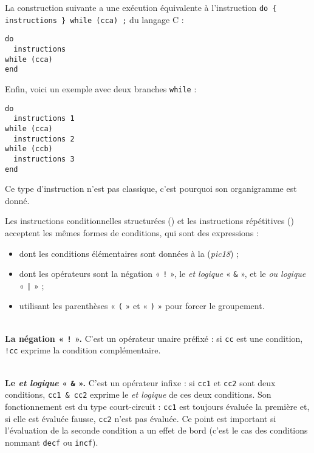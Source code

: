 La construction suivante a une exécution équivalente à l'instruction \texttt{do \{ instructions \} while (cca) ;} du langage C :
\begin{lstlisting}[language=piccolo]
do
  instructions
while (cca)
end
\end{lstlisting}

Enfin, voici un exemple avec deux branches \texttt{while} :
\begin{lstlisting}[language=piccolo]
do
  instructions 1
while (cca)
  instructions 2
while (ccb)
  instructions 3
end
\end{lstlisting}

Ce type d'instruction n'est pas classique, c'est pourquoi son organigramme est donné.







Les instructions conditionnelles structurées () et les instructions répétitives () acceptent les mêmes formes de conditions, qui sont des expressions :\begin{itemize}
  \item dont les conditions élémentaires sont données à la  (\emph{pic18}) ;
  \item dont les opérateurs sont la négation « \texttt{!} », le \emph{et logique} « \texttt{\&} », et le \emph{ou logique} « \texttt{|} » ;
  \item utilisant les parenthèses « \texttt{(} » et « \texttt{)} » pour forcer le groupement.
\end{itemize}

~\\
\textbf{La négation « \texttt{!} ».} C'est un opérateur unaire préfixé : si \texttt{cc} est une condition, \texttt{!cc} exprime la condition complémentaire. %


~\\
\textbf{Le \emph{et logique} « \texttt{\&} ».} C'est un opérateur infixe : si \texttt{cc1} et \texttt{cc2} sont deux conditions, \texttt{cc1 \& cc2} exprime le \emph{et logique} de ces deux conditions. Son fonctionnement est du type court-circuit : \texttt{cc1} est toujours évaluée la première et, si elle est évaluée fausse, \texttt{cc2} n'est pas évaluée. Ce point est important si l'évaluation de la seconde condition a un effet de bord (c'est le cas des conditions nommant \texttt{decf} ou \texttt{incf}).


